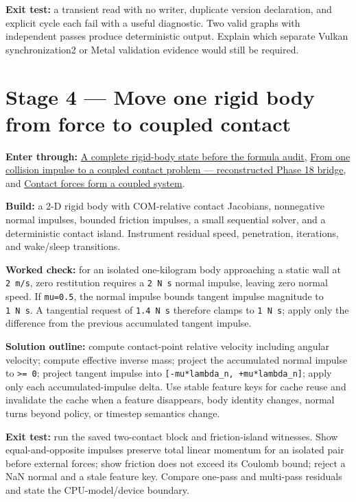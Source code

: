 \textbf{Exit test:} a transient read with no writer, duplicate version declaration, and explicit cycle each fail with a useful diagnostic. Two valid graphs with independent passes produce deterministic output. Explain which separate Vulkan synchronization2 or Metal validation evidence would still be required.

\section{Stage 4 --- Move one rigid body from force to coupled contact}\label{06-engine-ii-ch042-stage-4-move-one-rigid-body-from-force-to-coupled-contact}

\textbf{Enter through:} \hyperref[06-engine-ii-ch035-the-complete-kairo-state-so-far]{A complete rigid-body state before the formula audit}, \hyperref[06-engine-ii-ch040-from-one-collision-impulse-to-a-coupled-contact-problem-reconstructed-phase-18-bridge]{From one collision impulse to a coupled contact problem --- reconstructed Phase 18 bridge}, and \hyperref[06-engine-ii-ch046-contact-forces-form-a-coupled-system]{Contact forces form a coupled system}.

\textbf{Build:} a 2-D rigid body with COM-relative contact Jacobians, nonnegative normal impulses, bounded friction impulses, a small sequential solver, and a deterministic contact island. Instrument residual speed, penetration, iterations, and wake/sleep transitions.

\textbf{Worked check:} for an isolated one-kilogram body approaching a static wall at \texttt{2\ m/s}, zero restitution requires a \texttt{2\ N\ s} normal impulse, leaving zero normal speed. If \texttt{mu=0.5}, the normal impulse bounds tangent impulse magnitude to \texttt{1\ N\ s}. A tangential request of \texttt{1.4\ N\ s} therefore clamps to \texttt{1\ N\ s}; apply only the difference from the previous accumulated tangent impulse.

\textbf{Solution outline:} compute contact-point relative velocity including angular velocity; compute effective inverse mass; project the accumulated normal impulse to \texttt{\textgreater{}=\ 0}; project tangent impulse into \texttt{{[}-mu*lambda\_n,\ +mu*lambda\_n{]}}; apply only each accumulated-impulse delta. Use stable feature keys for cache reuse and invalidate the cache when a feature disappears, body identity changes, normal turns beyond policy, or timestep semantics change.

\textbf{Exit test:} run the saved two-contact block and friction-island witnesses. Show equal-and-opposite impulses preserve total linear momentum for an isolated pair before external forces; show friction does not exceed its Coulomb bound; reject a NaN normal and a stale feature key. Compare one-pass and multi-pass residuals and state the CPU-model/device boundary.

